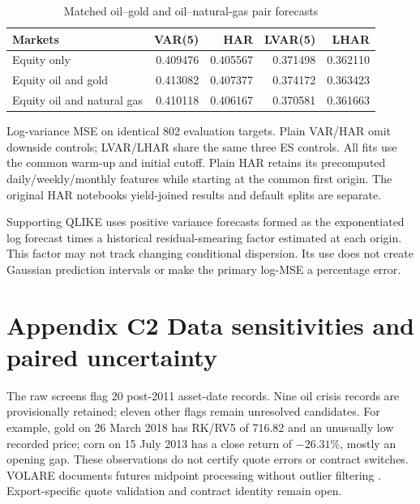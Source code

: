 \documentclass[11pt,letterpaper]{article}
\newcommand{\appendixpage}[2]{\clearpage\section*{#1}\label{#2}}
\begin{document}
\begin{table}[H]
\centering
\caption{Matched oil--gold and oil--natural-gas pair forecasts}\label{tab:matchedpairs}
\small
\begin{tabular}{p{2.2in}rrrr}
\toprule
Markets & VAR(5) & HAR & LVAR(5) & LHAR \\
\midrule
Equity only & 0.409476 & 0.405567 & 0.371498 & 0.362110 \\
Equity oil and gold & 0.413082 & 0.407377 & 0.374172 & 0.363423 \\
Equity oil and natural gas & 0.410118 & 0.406167 & 0.370581 & 0.361663 \\
\bottomrule
\end{tabular}
\end{table}
{\footnotesize Log-variance MSE on identical 802 evaluation targets. Plain VAR/HAR omit downside controls; LVAR/LHAR share the same three ES controls. All fits use the common warm-up and initial cutoff. Plain HAR retains its precomputed daily/weekly/monthly features while starting at the common first origin. The original HAR notebook\textquotesingle s yield-joined results and default splits are separate.\par}

Supporting QLIKE uses positive variance forecasts formed as the exponentiated
log forecast times a historical residual-smearing factor estimated at each origin.
This factor may not track changing conditional dispersion. Its use does not create
Gaussian prediction intervals or make the primary log-MSE a percentage error.

\appendixpage{Appendix C2 Data sensitivities and paired uncertainty}{app:robustness}
The raw screens flag 20 post-2011 asset-date records. Nine oil crisis records are
provisionally retained; eleven other flags remain unresolved candidates. For
example, gold on 26 March 2018 has RK/RV5 of 716.82 and an unusually low recorded
price; corn on 15 July 2013 has a close return of $-26.31$\%, mostly an opening
gap. These observations do not certify quote errors or contract switches.
VOLARE documents futures midpoint processing without outlier filtering
\cite{volare}. Export-specific quote validation and contract identity remain open.
\end{document}
